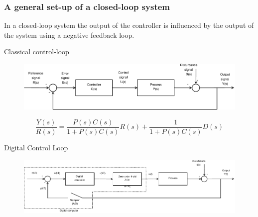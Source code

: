 \begin{frame}
	\frametitle{A general set-up of a closed-loop system}
	\begin{definition}
		In a closed-loop system the output of the controller is influenced by the output of the system using a negative feedback loop.
	\end{definition}
	\begin{block}{Classical control-loop}
		\begin{figure}
			\centering
			\includegraphics[width=0.9\linewidth]{Closed-Loop}
			\label{fig:Closed-Loop}
		\end{figure}
		\vspace{1em}
		\[ \frac{Y(s)}{R(s)} =  \frac{P(s)C(s)}{1 + P(s)C(s)}R(s) + \frac{1}{1 + P(s)C(s)}D(s)\]
	\end{block}
\end{frame}


\begin{frame}
	\begin{block}{Digital Control Loop}
		\begin{figure}
			\centering
			\includegraphics[width=1\linewidth]{digital-control-system}
			\label{fig:digital-control-system}
		\end{figure}
	\end{block}
\end{frame}

